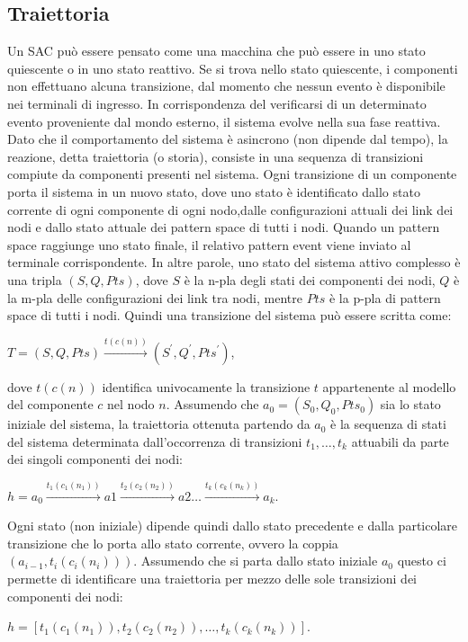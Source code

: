 \subsection{Traiettoria}
Un SAC può essere pensato come una macchina che può essere in uno stato quiescente o in uno stato reattivo. Se si trova nello stato quiescente, i componenti non effettuano alcuna transizione, dal momento che nessun evento è disponibile nei terminali di ingresso. In corrispondenza del verificarsi di un determinato evento proveniente dal mondo esterno, il sistema evolve nella sua fase reattiva. Dato che il comportamento del sistema è asincrono (non dipende dal tempo), la reazione, detta traiettoria (o storia), consiste in una sequenza di transizioni compiute da componenti presenti nel sistema.
Ogni transizione di un componente porta il sistema in un nuovo stato, dove uno stato è identificato dallo stato corrente di ogni componente di ogni nodo,dalle configurazioni attuali dei link dei nodi e dallo stato attuale dei pattern space di tutti i nodi. Quando un pattern space raggiunge uno stato finale, il relativo pattern event viene inviato al terminale corrispondente.
In altre parole, uno stato del sistema attivo complesso è una tripla $(S,Q,Pts)$, dove $S$ è la n-pla degli stati dei componenti dei nodi, $Q$ è la m-pla delle configurazioni dei link tra nodi, mentre $Pts$ è la p-pla di pattern space di tutti i nodi.
Quindi una transizione del sistema può essere scritta come:
\begin{center}
	$T = (S,Q,Pts) \xrightarrow {t(c(n))} (S^\prime,Q^\prime,Pts^\prime)$,
\end{center}
dove $t(c(n))$ identifica univocamente la transizione $t$ appartenente al modello del componente $c$ nel nodo $n$.
Assumendo che $a_0 = (S_0,Q_0,Pts_0)$ sia lo stato iniziale del sistema, la traiettoria ottenuta partendo da $a_0$ è la sequenza di stati del sistema determinata dall'occorrenza di transizioni $t_1, \ldots , t_k$ attuabili da parte dei singoli componenti dei nodi:
\begin{center}
$h = a_0 \xrightarrow{t_1(c_1(n_1))} a1 \xrightarrow{t_2(c_2(n_2))} a2 \ldots \xrightarrow{t_k(c_k(n_k))} a_k$.
\end{center}

Ogni stato (non iniziale) dipende quindi dallo stato precedente e dalla particolare transizione che lo porta allo stato corrente, ovvero la coppia $(a_{i-1},t_i(c_i(n_i)))$. Assumendo che si parta dallo stato iniziale $a_0$ questo ci permette di identificare una traiettoria per mezzo delle sole transizioni dei componenti dei nodi:
\begin{center}
$h = [t_1(c_1(n_1)),t_2(c_2(n_2)), \ldots , t_k(c_k(n_k))]$.
\end{center}



